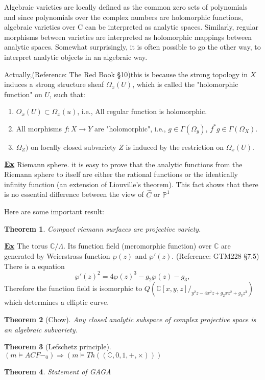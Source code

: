 \documentclass[a4paper]{article}
\newtheorem{thm}{Theorem}
\theoremstyle{definition}
\theoremstyle{remark}
\begin{document}
       \noindent{}

       Algebraic varieties are locally defined as the common zero sets of polynomials and since polynomials over the complex numbers are holomorphic functions, algebraic varieties over C can be interpreted as analytic spaces. Similarly, regular morphisms between varieties are interpreted as holomorphic mappings between analytic spaces. Somewhat surprisingly, it is often possible to go the other way, to interpret analytic objects in an algebraic way.

       Actually,(Reference: The Red Book \S 10)this is because the strong topology in $X$ induces a strong structure sheaf $\Omega_x(U)$, which is called the "holomorphic function" on $U$, such that:
       \begin{enumerate}
       \item $O_x(U) \subset \Omega_x(u)$, i.e., All regular function is holomorphic.
       \item All morphisms $f:X\rightarrow Y$ are "holomorphic", i.e., $g\in\Gamma(\Omega_y)$, $f^*g\in\Gamma(\Omega_X)$.
       \item $\Omega_Z)$ on locally closed subvariety $Z$ is induced by the restriction on $\Omega_x(U)$.
       \end{enumerate}

       \noindent$\underline{\bold{Ex}}$ Riemann sphere. \qquad it is easy to prove that the analytic functions from the Riemann sphere to itself are either the rational functions or the identically infinity function (an extension of Liouville's theorem). This fact shows that there is no essential difference between the view of $\hat C$ or $\mathbb{P}^1$

       Here are some important result:
       \begin{thm}Compact riemann surfaces are projective variety.
       \end{thm}

       \noindent$\underline{\bold{Ex}}$ The torus $\mathbb{C}/\Lambda$. Its function field (meromorphic function) over $\mathbb{C}$ are generated by Weierstrass function $\wp(z)$ and $\wp\prime(z)$. (Reference: GTM228 \S 7.5)  There is a equation
         \[\wp '(z)^{2}=4\wp (z)^{3}-g_{2}\wp (z)-g_{3},\] Therefore the function field is isomorphic to $Q(\mathbb{C}[x,y,z]/_{y^2z-4x^2z+g_2xz^2+g_3z^3})$ which determines a elliptic curve.

       \begin{thm}[Chow] Any closed analytic subspace of complex projective space is an algebraic subvariety.\end{thm}

       \begin{thm}[Lefschetz principle] $(m\models ACF-_0) \Rightarrow (m\models Th((\mathbb{C},0,1,+,\times)))$ \end{thm}

       \begin{thm}Statement of GAGA\end{thm}
       
\end{document}
